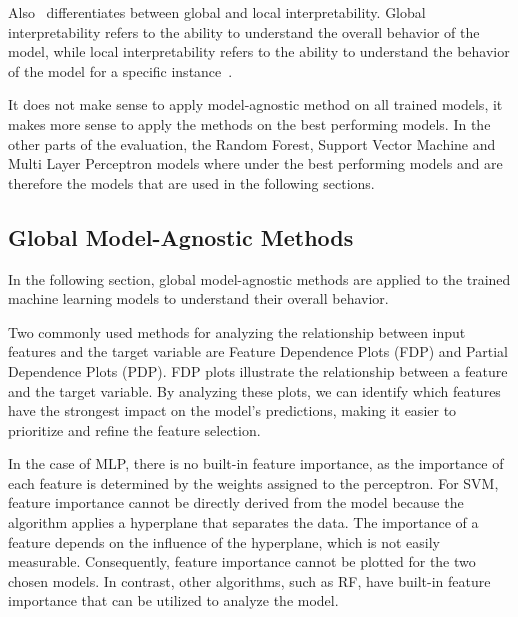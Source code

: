 Also~\cite{hall2019introduction} differentiates between global and local interpretability.
Global interpretability refers to the ability to understand the overall behavior of
the model, while local interpretability refers to the ability to understand the behavior of the
model for a specific instance~\cite[p. 19]{hall2019introduction}.

It does not make sense to apply model-agnostic method on all trained models, it makes more sense to
apply the methods on the best performing models.
In the other parts of the evaluation, the Random Forest, Support Vector Machine and Multi Layer Perceptron models
where under the best performing models and are therefore the models that are used in the following
sections.

\subsection{Global Model-Agnostic Methods}\label{subsec:global-model-agnostic-methods}
In the following section, global model-agnostic methods are applied to the trained machine learning models to
understand their overall behavior.

Two commonly used methods for analyzing the relationship between input features
and the target variable are Feature Dependence Plots (FDP) and Partial Dependence Plots (PDP).
FDP plots illustrate the relationship between a feature and the target variable.
By analyzing these plots, we can identify which features have the strongest impact on the model's
predictions, making it easier to prioritize and refine the feature selection.

In the case of \ac{MLP}, there is no built-in feature importance, as the importance of each feature is determined by
the weights assigned to the perceptron.
For \ac{SVM}, feature importance cannot be directly derived from the model
because the algorithm applies a hyperplane that separates the data.
The importance of a feature depends on the influence of the hyperplane, which is not easily measurable.
Consequently, feature importance cannot be plotted for
the two chosen models.
In contrast, other algorithms, such as \ac{RF}, have built-in feature importance that can
be utilized to analyze the model.


